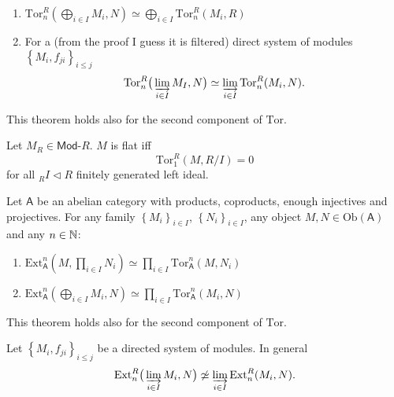 \begin{prop}\leavevmode\vspace{-.2\baselineskip}
	\begin{enumerate}
		\item $\mathrm{Tor}^R_n \left( \bigoplus_{i \in I} M_i, N \right) \simeq
			\bigoplus_{i \in I} \mathrm{Tor}^R_n(M_i,R)$

		\item For a (from the proof I guess it is filtered)
			direct system of modules $\left\{ M_i, f_{ji} \right\}_{i \leq j}$
			\begin{equation}
				\mathrm{Tor}^R_n \big( \varinjlim_{i \in I} M_I, N \big) \simeq
				\varinjlim_{i \in I} \mathrm{Tor}^R_n(M_i, N)
			.\end{equation} 
	\end{enumerate}
	This theorem holds also for the second component of $\mathrm{Tor}$.
\end{prop}

\begin{lem}
	Let $M_R \in \mathsf{Mod}\text{-}R$.
	$M$ is flat iff 
	\begin{equation}
		\mathrm{Tor}^R_1 (M, R/I) = 0
	\end{equation} 
	for all ${}_RI \triangleleft R$ finitely generated left ideal.
\end{lem} 

\begin{prop}
	Let $\mathsf{A}$ be an abelian category with products, coproducts,
	enough injectives and projectives.
	For any family $\left\{ M_i \right\}_{i \in I}$, $\left\{ N_i \right\}_{i \in I}$,
	any object $M,N \in \mathrm{Ob} \left(\mathsf{A}\right)$ and any $n \in \mathbb{N}$:
	\begin{enumerate}
		\item $\mathrm{Ext}^n_{\mathsf{A}} \left( M, \prod_{i \in I} N_i\right) \simeq
			\prod_{i \in I} \mathrm{Tor}^n_{\mathsf{A}}(M,N_i)$
		\item $\mathrm{Ext}^n_{\mathsf{A}} \left( \bigoplus_{i \in I}M_i, N \right) \simeq
			\prod_{i \in I} \mathrm{Tor}^n_{\mathsf{A}}(M_i,N)$
	\end{enumerate}
	This theorem holds also for the second component of $\mathrm{Tor}$.
\end{prop}

\begin{rem}[]
	Let $\left\{ M_i, f_{ji} \right\}_{i \leq j}$ be a directed system of modules.
	In general
	\begin{equation}
		\mathrm{Ext}^R_n \big( \varinjlim_{i \in I} M_i, N\big)
		\not\simeq \varinjlim_{i \in I} \mathrm{Ext}^R_n (M_i, N)
	.\end{equation} 
\end{rem}

